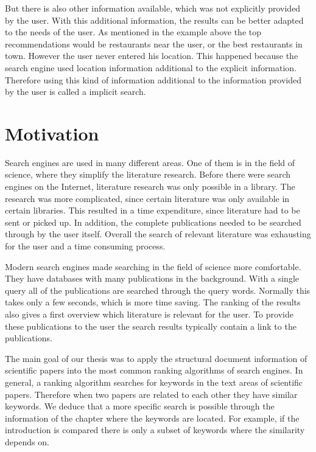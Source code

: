 But there is also other information available, which was not explicitly provided by the user. With this additional information, the results can be better adapted to the needs of the user. As mentioned in the example above the top recommendations would be restaurants near the user, or the best restaurants in town. However the user never entered his location. This happened because the search engine used location information additional to the explicit information. Therefore using this kind of information additional to the information provided by the user is called a implicit search.

\section{Motivation}
\label{sec:Motivation}

Search engines are used in many different areas. One of them is in the field of science, where they simplify the literature research. Before there were search engines on the Internet, literature research was only possible in a library. The research was more complicated, since certain literature was only available in certain libraries. This resulted in a time expenditure, since literature had to be sent or picked up. In addition, the complete publications needed to be searched through by the user itself. Overall the search of relevant literature was exhausting for the user and a time consuming process.

Modern search engines made searching in the field of science more comfortable. They have databases with many publications in the background. With a single query all of the publications are searched through the query words. Normally this takes only a few seconds, which is more time saving. The ranking of the results also gives a first overview which literature is relevant for the user. To provide these publications to the user the search results typically contain a link to the publications.

The main goal of our thesis was to apply the structural document information of scientific papers into the most common ranking algorithms of search engines. In general, a ranking algorithm searches for keywords in the text areas of scientific papers. Therefore when two papers are related to each other they have similar keywords. We deduce that a more specific search is possible through the information of the chapter where the keywords are located. For example, if the introduction is compared there is only a subset of keywords where the similarity depends on.

